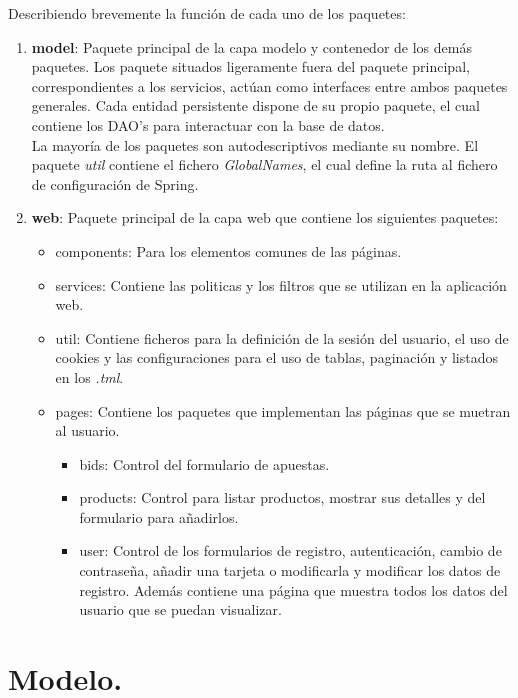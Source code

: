 \documentclass[12pt,a4paper,twoside,spanish]{article}      %
\begin{document}
Describiendo brevemente la función de cada uno de los paquetes:
\begin{enumerate}
 \item \textbf{model}: Paquete principal de la capa modelo y contenedor de los demás paquetes. Los paquete situados ligeramente
 fuera del paquete principal, correspondientes a los servicios, actúan como interfaces entre ambos paquetes generales. Cada
 entidad persistente dispone de su propio paquete, el cual contiene los DAO's para interactuar con la base de datos.\\
  La mayoría de los paquetes son autodescriptivos mediante su nombre. El paquete \textit{util} contiene el fichero 
\textit{GlobalNames}, el cual define la ruta al fichero de configuración de Spring.
 \item \textbf{web}: Paquete principal de la capa web que contiene los siguientes paquetes:
  \begin{itemize}
   \item components: Para los elementos comunes de las páginas.
   \item services: Contiene las politicas y los filtros que se utilizan en la aplicación web.
   \item util: Contiene ficheros para la definición de la sesión del usuario, el uso de cookies y las configuraciones para el
   uso de tablas, paginación y listados en los \textit{.tml}.
   \item pages: Contiene los paquetes que implementan las páginas que se muetran al usuario.
    \begin{itemize}
     \item bids: Control del formulario de apuestas.
     \item products: Control para listar productos, mostrar sus detalles y del formulario para añadirlos.
     \item user: Control de los formularios de registro, autenticación, cambio de contraseña, añadir una tarjeta o modificarla y
     modificar los datos de registro. Además contiene una página que muestra todos los datos del usuario que se puedan visualizar.
    \end{itemize}
  \end{itemize}
\end{enumerate}



\section{Modelo.}
\end{document}
